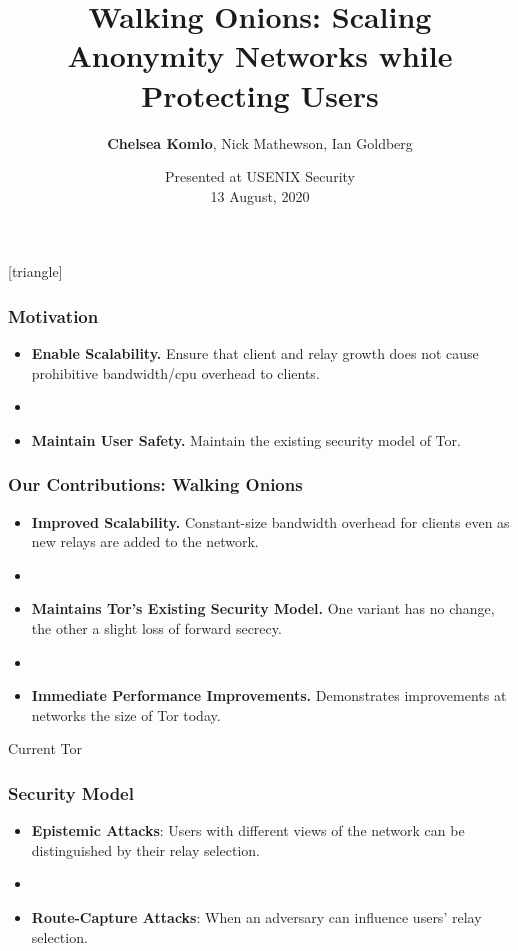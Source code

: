 \documentclass[hyperref={pdfpagelabels=true},table,dvipsnames,14pt,aspectratio=169]{beamer}
\title[Walking Onions]{Walking Onions: Scaling Anonymity Networks while Protecting Users}
\author{\textbf{Chelsea Komlo}, Nick Mathewson, Ian Goldberg}
\date{Presented at USENIX Security \\ 13 August, 2020}
\begin{document}
[triangle]

\begin{frame}
        \thispagestyle{empty}
        \maketitle
\end{frame}


\begin{frame}
\frametitle{Motivation}
  \begin{itemize}
    \item \textbf{Enable Scalability.} Ensure that client and relay growth
      does not cause prohibitive bandwidth/cpu overhead to clients.
    \item[]~
    \item \textbf{Maintain User Safety.} Maintain the existing security model of Tor.
  \end{itemize}
\end{frame}

\begin{frame}
\frametitle{Our Contributions: Walking Onions}
  \begin{itemize}
    \item \textbf{Improved Scalability.} Constant-size bandwidth overhead for
      clients even as new relays are added to the network.
    \item[]~
    \item \textbf{Maintains Tor's Existing Security Model.} One variant has no change,
      the other a slight loss of forward secrecy.
    \item[]~
    \item \textbf{Immediate Performance Improvements.} Demonstrates
      improvements at networks the size of Tor today.
  \end{itemize}
\end{frame}

\begin{frame}
  \centering
  \huge
  Current Tor
\end{frame}

\begin{frame}
\frametitle{Security Model}

  \begin{itemize}
    \item \textbf{Epistemic Attacks}: Users with different views of the
      network can be distinguished by their relay selection.
    \item[]~
    \item \textbf{Route-Capture Attacks}: When an adversary can influence
      users' relay selection.
  \end{itemize}

\end{frame}
\end{document}
